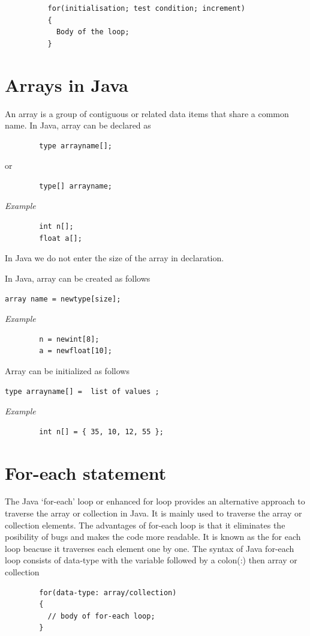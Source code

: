 \documentclass[11pt, a4paper]{book}
\begin{document}
        \begin{lstlisting}
          for(initialisation; test condition; increment)
          {
            Body of the loop;
          }
        \end{lstlisting}
    
    \section{Arrays in Java}
      An array is a group of contiguous or related data items that share a common name. In Java, array can be declared as
      
      \begin{lstlisting}
        type arrayname[];
        \end{lstlisting}
        or 
        \begin{lstlisting}
        type[] arrayname;
      \end{lstlisting}
      
      \textit{Example}
      \begin{lstlisting}
        int n[];
        float a[];
      \end{lstlisting}
      
      In Java we do not enter the size of the array in declaration.
      
      In Java, array can be created as follows 
      
      \texttt{array name = newtype[size];}
      
      \textit{Example}
      
      \begin{lstlisting}
        n = newint[8];
        a = newfloat[10];
      \end{lstlisting}
      
      Array can be initialized as follows
      
      \texttt{type arrayname[] = { list of values };}
      
      \textit{Example}
      
      \begin{lstlisting}
        int n[] = { 35, 10, 12, 55 };
      \end{lstlisting}
    
    \section{For-each statement}
      The Java `for-each' loop or enhanced for loop provides an alternative approach to traverse the array or collection in Java. It is mainly used to traverse the array or collection elements. The advantages of for-each loop is that it eliminates the posibility of bugs and makes the code more readable.
      It is known as the for each loop beacuse it traverses each element one by one. The syntax of Java for-each loop consists of data-type with the variable followed by a colon(:) then array or collection
      \begin{lstlisting}
        for(data-type: array/collection)
        {
          // body of for-each loop;
        }
      \end{lstlisting}
  
\end{document}
